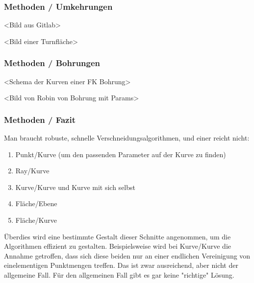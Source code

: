 \documentclass[8pt, aspectratio=169]{beamer}
\begin{document}
\begin{frame}
	\frametitle{Methoden / Umkehrungen}
	\vspace{-1cm}\hspace{-0.5cm}
	\begin{minipage}[t]{.49\textwidth}
		\centering
		<Bild aus Gitlab>
	\end{minipage}
	\begin{minipage}[t]{.49\textwidth}
		\centering
		<Bild einer Turnfläche>
	\end{minipage}
\end{frame}

\begin{frame}
	\frametitle{Methoden / Bohrungen}
	\vspace{-1cm}\hspace{-0.5cm}
	\begin{minipage}[t]{.49\textwidth}
		\centering
		<Schema der Kurven einer FK Bohrung>
	\end{minipage}
	\begin{minipage}[t]{.49\textwidth}
		\centering
		<Bild von Robin von Bohrung mit Params>
	\end{minipage}
\end{frame}

\begin{frame}
	\frametitle{Methoden / Fazit}
	\vspace{-1cm}\hspace{-0.5cm}
	\begin{minipage}[t]{.49\textwidth}
		\centering
		Man braucht robuste, schnelle Verschneidungsalgorithmen, und einer reicht nicht:
		\begin{enumerate}
			\item Punkt/Kurve (um den passenden Parameter auf der Kurve zu finden)
			\item Ray/Kurve
			\item Kurve/Kurve und Kurve mit sich selbst
			\item Fläche/Ebene
			\item Fläche/Kurve
		\end{enumerate}
		Überdies wird eine bestimmte Gestalt dieser Schnitte angenommen, um die Algorithmen effizient zu gestalten. Beispielsweise wird bei Kurve/Kurve die Annahme getroffen, dass sich diese beiden nur an einer endlichen Vereinigung von einelementigen Punktmengen treffen. Das ist zwar ausreichend, aber nicht der allgemeine Fall. Für den allgemeinen Fall gibt es gar keine "richtige" Lösung.
	\end{minipage}
\end{frame}
\end{document}
